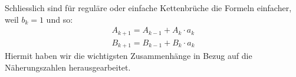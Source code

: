 Schliesslich sind für reguläre oder einfache Kettenbrüche die Formeln einfacher, weil $b_k = 1$
und so:
\begin{align*}
A_{k+1} = A_{k-1} + A_k \cdot a_k \\
B_{k+1} = B_{k-1} + B_k \cdot a_k
\end{align*}
Hiermit haben wir die wichtigsten Zusammenhänge in Bezug auf die Näherungszahlen herausgearbeitet.
